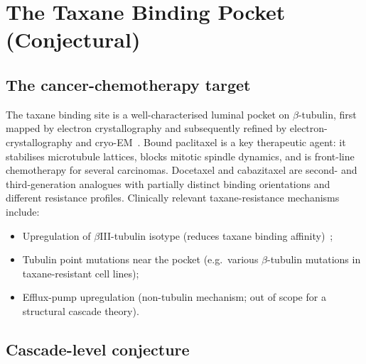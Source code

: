 \documentclass[12pt]{article}
\begin{document}
\section{The Taxane Binding Pocket (Conjectural)}\label{sec:taxane}

\subsection{The cancer-chemotherapy target}

The taxane binding site is a well-characterised luminal pocket on
$\beta$-tubulin, first mapped by electron crystallography
\cite{LoweNogalesDowning2001} and subsequently refined by
electron-crystallography and
cryo-EM~\cite{NogalesWolfDowning1995,LoweNogalesDowning2001,Snyder2001}. Bound paclitaxel is a key
therapeutic agent: it stabilises microtubule lattices, blocks
mitotic spindle dynamics, and is front-line chemotherapy for
several carcinomas. Docetaxel and cabazitaxel are second- and
third-generation analogues with partially distinct binding
orientations and different resistance profiles. Clinically
relevant taxane-resistance mechanisms include:
\begin{itemize}
\item Upregulation of $\beta$III-tubulin isotype (reduces taxane
  binding affinity)~\cite{MozziconacciKavallarisReview};
\item Tubulin point mutations near the pocket (e.g.\ various
  $\beta$-tubulin mutations in taxane-resistant cell lines);
\item Efflux-pump upregulation (non-tubulin mechanism; out of
  scope for a structural cascade theory).
\end{itemize}

\subsection{Cascade-level conjecture}
\end{document}
